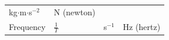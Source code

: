 {\begin{tabular}[t]{|l|l|l|l|}
    
        kg\begin{math}\ensuremath{\cdot}\end{math}m\begin{math}\ensuremath{\cdot}\end{math}s\begin{math}{}^{-2}\end{math} &
    
    
        N (newton)%
     \tabularnewline\cline{1-1}\cline{2-2}\cline{3-3}\cline{4-4}
    
    
        Frequency &
    
    
        
                \begin{math}\frac{1}{T}\end{math}
               &
    
    
        s\begin{math}{}^{-1}\end{math} &
    
    
        Hz (hertz)%
     \tabularnewline\cline{1-1}\cline{2-2}\cline{3-3}\cline{4-4}
    

\end{tabular}}
